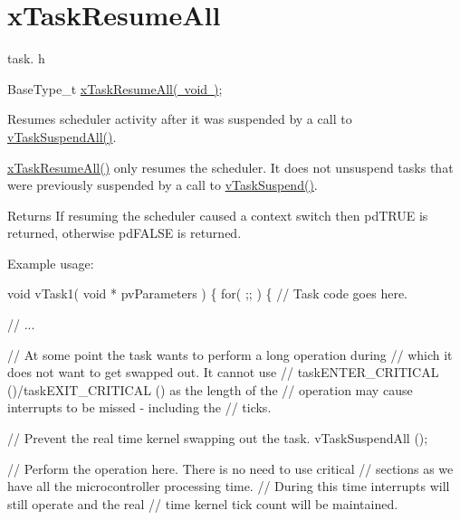 \hypertarget{group__x_task_resume_all}{}\section{x\+Task\+Resume\+All}
\label{group__x_task_resume_all}
task. h 
\begin{DoxyPre}BaseType\_t \mbox{\hyperlink{task_8h_a003f8ae6d649225abd030cc76e1c7d0e}{xTaskResumeAll( void )}};\end{DoxyPre}


Resumes scheduler activity after it was suspended by a call to \mbox{\hyperlink{task_8h_a366b302eba79d10b5ee2a3756f0fcc43}{v\+Task\+Suspend\+All()}}.

\mbox{\hyperlink{task_8h_a003f8ae6d649225abd030cc76e1c7d0e}{x\+Task\+Resume\+All()}} only resumes the scheduler. It does not unsuspend tasks that were previously suspended by a call to \mbox{\hyperlink{task_8h_a84d4e660b04630be2939d91b3c2412f8}{v\+Task\+Suspend()}}.

\begin{DoxyReturn}{Returns}
If resuming the scheduler caused a context switch then pd\+T\+R\+UE is returned, otherwise pd\+F\+A\+L\+SE is returned.
\end{DoxyReturn}
Example usage\+: 
\begin{DoxyPre}
void vTask1( void * pvParameters )
\{
    for( ;; )
    \{
     // Task code goes here.\end{DoxyPre}



\begin{DoxyPre}     // ...\end{DoxyPre}



\begin{DoxyPre}     // At some point the task wants to perform a long operation during
     // which it does not want to get swapped out.  It cannot use
     // taskENTER\_CRITICAL ()/taskEXIT\_CRITICAL () as the length of the
     // operation may cause interrupts to be missed - including the
     // ticks.\end{DoxyPre}



\begin{DoxyPre}     // Prevent the real time kernel swapping out the task.
     vTaskSuspendAll ();\end{DoxyPre}



\begin{DoxyPre}     // Perform the operation here.  There is no need to use critical
     // sections as we have all the microcontroller processing time.
     // During this time interrupts will still operate and the real
     // time kernel tick count will be maintained.\end{DoxyPre}



